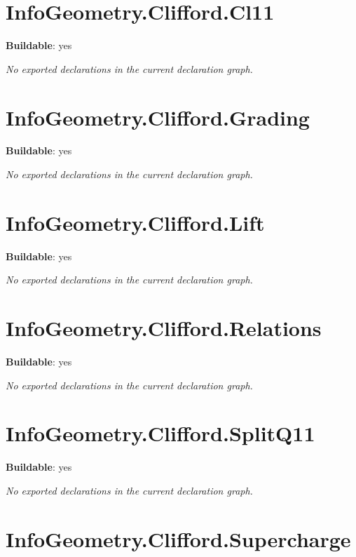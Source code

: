 \begin{theorem}[blueprint="infogeometry:clifford:splitq11_eq_splitb11_diag"]
\end{theorem}

\section{InfoGeometry.Clifford.Cl11}

\noindent\textbf{Buildable}: yes

\noindent\emph{No exported declarations in the current declaration graph.}

\section{InfoGeometry.Clifford.Grading}

\noindent\textbf{Buildable}: yes

\noindent\emph{No exported declarations in the current declaration graph.}

\section{InfoGeometry.Clifford.Lift}

\noindent\textbf{Buildable}: yes

\noindent\emph{No exported declarations in the current declaration graph.}

\section{InfoGeometry.Clifford.Relations}

\noindent\textbf{Buildable}: yes

\noindent\emph{No exported declarations in the current declaration graph.}

\section{InfoGeometry.Clifford.SplitQ11}

\noindent\textbf{Buildable}: yes

\noindent\emph{No exported declarations in the current declaration graph.}

\section{InfoGeometry.Clifford.Supercharge}

